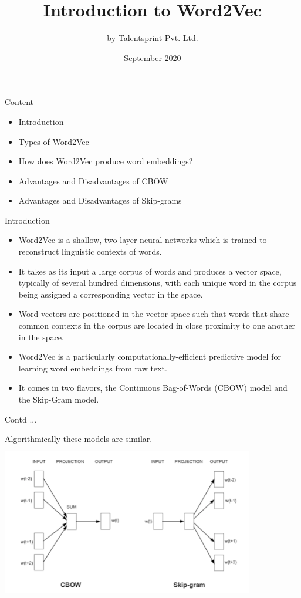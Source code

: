 \documentclass{beamer}
\title{Introduction to Word2Vec}
\author{by Talentsprint Pvt. Ltd.}
\date{September 2020}
\begin{document}
\maketitle
\begin{frame}{Content}
	\begin{itemize}
		\item Introduction
		\item Types of Word2Vec
		\item How does Word2Vec produce word embeddings?
		\item Advantages and Disadvantages of CBOW
		\item Advantages and Disadvantages of Skip-grams
	\end{itemize}
\end{frame}

\begin{frame}{Introduction}
\begin{flushleft}
\begin{itemize}
	\item Word2Vec is a shallow, two-layer neural networks which is trained to reconstruct linguistic contexts of words.
	\item It takes as its input a large corpus of words and produces a vector space, typically of several hundred dimensions, with each unique word in the corpus being assigned a corresponding vector in the space.
	\item Word vectors are positioned in the vector space such that words that share common contexts in the corpus are located in close proximity to one another in the space.
	\item Word2Vec is a particularly computationally-efficient predictive model for learning word embeddings from raw text.
	\item It comes in two flavors, the Continuous Bag-of-Words (CBOW) model and the Skip-Gram model.
\end{itemize}
\end{flushleft}
\end{frame}

\begin{frame}{Contd ...}
	\begin{flushleft}
		Algorithmically these models are similar.\\
		\vspace{5pt}
		\includegraphics[height=7cm, width=11cm]{CBOW_skipgram}\\
	\end{flushleft}
\end{frame}
\end{document}
